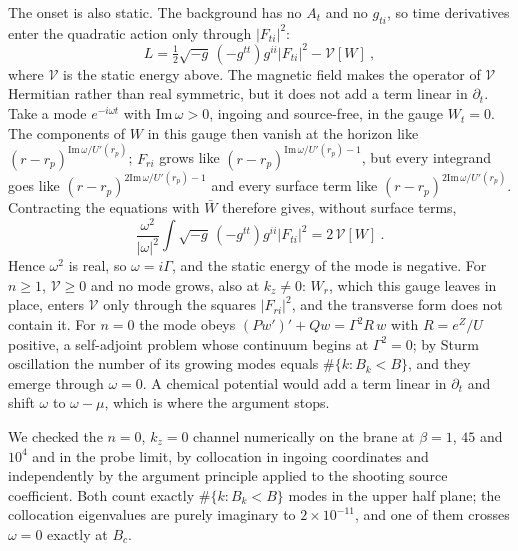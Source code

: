 The onset is also static. The background has no $A_t$ and no $g_{ti}$, so
time derivatives enter the quadratic action only through $|F_{ti}|^2$:
\begin{equation}
L = \tfrac12\sqrt{-g}\,(-g^{tt})g^{ii}|F_{ti}|^2 - \mathcal V[W]~,
\end{equation}
where $\mathcal V$ is the static energy above. The magnetic field makes the
operator of $\mathcal V$ Hermitian rather than real symmetric, but it does
not add a term linear in $\partial_t$. Take a mode $e^{-i\omega t}$ with
$\mathrm{Im}\,\omega > 0$, ingoing and source-free, in the gauge $W_t = 0$.
The components of $W$ in this gauge then vanish at the horizon like
$(r - r_p)^{\mathrm{Im}\,\omega/U'(r_p)}$; $F_{ri}$ grows like
$(r - r_p)^{\mathrm{Im}\,\omega/U'(r_p) - 1}$, but every integrand goes
like $(r - r_p)^{2\mathrm{Im}\,\omega/U'(r_p) - 1}$ and every surface term
like $(r - r_p)^{2\mathrm{Im}\,\omega/U'(r_p)}$. Contracting the equations
with $\bar W$ therefore gives, without surface terms,
\begin{equation}
\frac{\omega^2}{|\omega|^2}\int\sqrt{-g}\,(-g^{tt})g^{ii}|F_{ti}|^2 = 2\,\mathcal V[W]~.
\end{equation}
Hence $\omega^2$ is real, so $\omega = i\Gamma$, and the static energy of
the mode is negative. For $n \ge 1$, $\mathcal V \ge 0$ and no mode grows,
also at $k_z \neq 0$: $W_r$, which this gauge leaves in place, enters
$\mathcal V$ only through the squares $|F_{ri}|^2$, and the transverse form
does not contain it. For $n = 0$ the mode obeys
$(Pw')' + Qw = \Gamma^2 R\,w$ with $R = e^{Z}/U$ positive,
a self-adjoint problem whose continuum begins at $\Gamma^2 = 0$; by Sturm
oscillation the number of its growing modes equals $\#\{k : B_k < B\}$,
and they emerge through $\omega = 0$. A chemical potential would add a term linear in
$\partial_t$ and shift $\omega$ to $\omega - \mu$, which is where the
argument stops.

We checked the $n = 0$, $k_z = 0$ channel numerically on the brane at
$\beta = 1$, $45$ and $10^4$ and in the probe limit, by collocation in
ingoing coordinates and independently by the argument principle applied to
the shooting source coefficient. Both count exactly
$\#\{k : B_k < B\}$ modes in the upper half plane; the collocation
eigenvalues are purely imaginary to
$2\times10^{-11}$, and one of them crosses $\omega = 0$ exactly at $B_c$.
